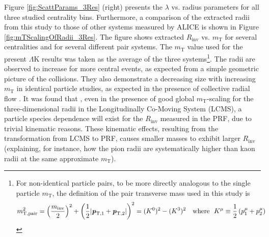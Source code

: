 \documentclass[ALICE,manyauthors]{cernphprep}
\newcommand{\mt}{$m_{\mathrm{T}}$\xspace}
\newcommand{\LamK}{$\Lambda$K\xspace}
\begin{document}
Figure \ref{fig:ScattParams_3Res} (right) presents the $\lambda$ vs. radius parameters for all three studied centrality bins. 
Furthermore, a comparison of the extracted radii from this study to those of other systems measured by ALICE \cite{Adam:2015vja} is shown in Figure \ref{fig:mTScalingOfRadii_3Res}. 
The figure shows extracted $R_{\mathrm{inv}}$ vs. \mt for several centralities and for several different pair systems.
The \mt value used for the present \LamK results was taken as the average of the three systems\footnote[1]
{
For non-identical particle pairs, to be more directly analogous to the single particle \mt, the definition of the pair transverse mass used in this study is
\begin{equation*}
\begin{aligned}
 m_{\mathrm{T, pair}}^{2} &= \left( \frac{m_{\mathrm{inv}}}{2} \right)^{2} + \left( \frac{1}{2} |\textbf{\textit{p}}_{\mathrm{T,1}} + \textbf{\textit{p}}_{\mathrm{T,2}}| \right)^{2} = (K^{0})^{2} - (K^{3})^{2} \quad \mathrm{where} ~~K^{\mu} \equiv \frac{1}{2} \left( p_{1}^{\mu} + p_{2}^{\mu} \right)
\end{aligned}
\label{eqn:PairmTv1}
\end{equation*}
}.
The radii are observed to increase for more central events, as expected from a simple geometric picture of the collisions.
They also demonstrate a decreasing size with increasing \mt in identical particle studies, as expected in the presence of collective radial flow \cite{Akkelin:1995gh}.
It was found that \cite{Kisiel:2014upa}, even in the presence of good global \mt-scaling for the three-dimensional radii in the Longitudinally Co-Moving System (LCMS), a particle species dependence will exist for the $R_{\mathrm{inv}}$ measured in the PRF, due to trivial kinematic reasons.
These kinematic effects, resulting from the transformation from LCMS to PRF, causes smaller masses to exhibit larger $R_{\mathrm{inv}}$ \cite{Adam:2015vja} (explaining, for instance, how the pion radii are systematically higher than kaon radii at the same approximate \mt).
\end{document}
